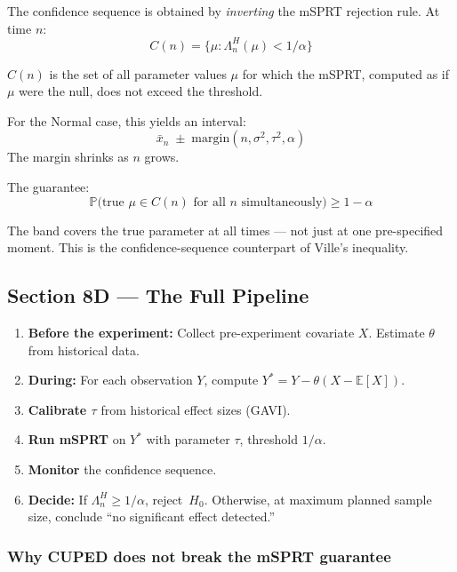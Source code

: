 \documentclass[12pt, a4paper]{article}
\newcommand{\E}{\mathbb{E}}            %
\newcommand{\Prob}{\mathbb{P}}         %
\newcommand{\LR}{\Lambda}              %
\begin{document}
The confidence sequence is obtained by \emph{inverting} the mSPRT rejection
rule.  At time $n$:
\[
  C(n) = \bigl\{\mu : \LR_n^{H}(\mu) < 1/\alpha \bigr\}
\]
\begin{plainlanguage}
$C(n)$ is the set of all parameter values $\mu$ for which the mSPRT,
computed as if $\mu$ were the null, does not exceed the threshold.
\end{plainlanguage}

For the Normal case, this yields an interval:
\[
  \bar{x}_n \;\pm\; \text{margin}(n, \sigma^2, \tau^2, \alpha)
\]
The margin shrinks as $n$ grows.

The guarantee:
\[
  \boxed{\Prob\!\bigl(\text{true } \mu \in C(n) \text{ for all } n
         \text{ simultaneously}\bigr) \geq 1-\alpha}
\]

\begin{plainlanguage}
The band covers the true parameter at all times --- not just at one
pre-specified moment.  This is the confidence-sequence counterpart of Ville's
inequality.
\end{plainlanguage}

\subsection{Section 8D --- The Full Pipeline}

\begin{enumerate}
  \item \textbf{Before the experiment:} Collect pre-experiment covariate $X$.
        Estimate $\theta$ from historical data.
  \item \textbf{During:} For each observation $Y$, compute
        $Y^* = Y - \theta(X - \E[X])$.
  \item \textbf{Calibrate $\tau$} from historical effect sizes (GAVI).
  \item \textbf{Run mSPRT} on $Y^*$ with parameter $\tau$, threshold
        $1/\alpha$.
  \item \textbf{Monitor} the confidence sequence.
  \item \textbf{Decide:} If $\LR_n^{H} \geq 1/\alpha$, reject~$H_0$.
        Otherwise, at maximum planned sample size, conclude ``no significant
        effect detected.''
\end{enumerate}

\subsubsection*{Why CUPED does not break the mSPRT guarantee}
\end{document}
